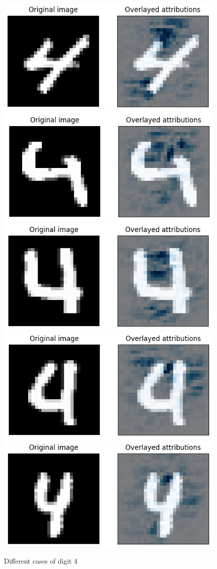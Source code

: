 \documentclass[journal, a4paper]{IEEEtran}
\begin{document}
\begin{figure}[ht]\centering
    \includegraphics[width=.6\linewidth]{img/saliency_mnist/4_1.png}
    \includegraphics[width=.6\linewidth]{img/saliency_mnist/4_2.png}
    \includegraphics[width=.6\linewidth]{img/saliency_mnist/4_3.png}
    \includegraphics[width=.6\linewidth]{img/saliency_mnist/4_4.png}
    \includegraphics[width=.6\linewidth]{img/saliency_mnist/4_5.png}
    \caption{Different cases of digit 4}\label{fig:saliency-mnist-4-multiple}
\end{figure}
\end{document}
